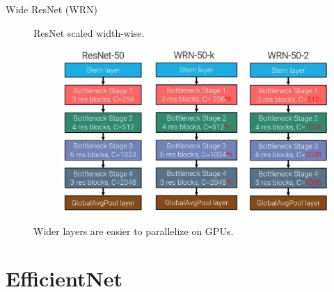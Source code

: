 \begin{description}
    \item[Wide ResNet (WRN)] 
        ResNet scaled width-wise.

        \begin{figure}[H]
            \centering
            \includegraphics[width=0.5\linewidth]{./img/wide_resnet.jpg}
        \end{figure}

        \begin{remark}
            Wider layers are easier to parallelize on GPUs.
        \end{remark}
\end{description}



\section{EfficientNet}

